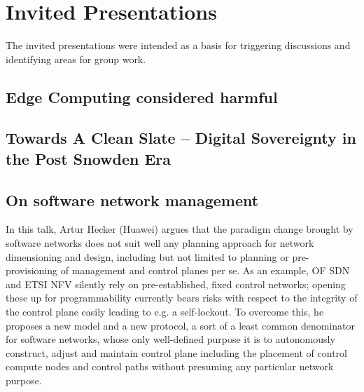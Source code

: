 \section{Invited Presentations}\label{sec:invited-presentations}

The invited presentations were intended as a basis for triggering discussions
and identifying areas for group work.

\subsection{Edge Computing considered harmful}


\subsection{Towards A Clean Slate -- Digital Sovereignty in the Post Snowden Era}


\subsection{On software network management}

In this talk, Artur Hecker (Huawei) argues that the paradigm change brought by
software networks does not suit well any planning approach for network
dimensioning and design, including but not limited to planning or
pre-provisioning of management and control planes per se. As an example, OF
\ac{SDN} and ETSI \ac{NFV} silently rely on pre-established, fixed control
networks; opening these up for programmability currently bears risks with
respect to the integrity of the control plane easily leading to e.g. a
self-lockout. To overcome this, he proposes a new model and a new protocol, a
sort of a least common denominator for software networks, whose only
well-defined purpose it is to autonomously construct, adjust and maintain
control plane including the placement of control compute nodes and control
paths without presuming any particular network purpose.

